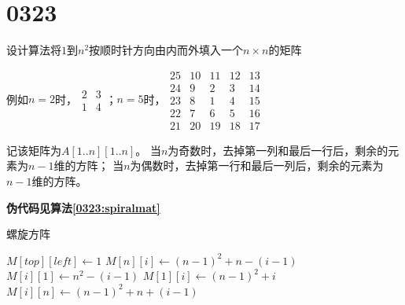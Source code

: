 \section{0323}\label{sec:0323}
\begin{questions}

    \question 设计算法将$1$到$n^2$按顺时针方向由内而外填入一个$n \times n$的矩阵

    例如$n=2$时，$
        \begin{array}{cc}
            2 & 3 \\
            1 & 4
        \end{array}
    $；$n=5$时，$
        \begin{array}{ccccc}
            25 & 10 & 11 & 12 & 13 \\
            24 & 9  & 2  & 3  & 14 \\
            23 & 8  & 1  & 4  & 15 \\
            22 & 7  & 6  & 5  & 16 \\
            21 & 20 & 19 & 18 & 17
        \end{array}
    $

    \begin{solution}
        记该矩阵为$A[1..n][1..n]$。
        当$n$为奇数时，去掉第一列和最后一行后，剩余的元素为$n-1$维的方阵；
        当$n$为偶数时，去掉第一行和最后一列后，剩余的元素为$n-1$维的方阵。

        \textbf{伪代码见算法\ref{0323:spiralmat}}
    \end{solution}

    \begin{algorithm}[!htp]
        \caption{螺旋方阵}\label{0323:spiralmat}
        \begin{algorithmic}[1]
            \State {}
            \Statex
            \Statex
            \State $M[top][left] \gets 1$
             
            \State {} 
            \State $M[n][i] \gets (n-1)^2 + n - (i - 1)$ 
            \State $M[i][1] \gets n^2 - (i - 1)$ 
            \EndFor
            \Else {}
            \State {} 
            \State $M[1][i] \gets (n-1)^2 + i$ 
            \State $M[i][n] \gets (n-1)^2 + n + (i - 1)$ 
            \EndFor
            \EndIf
            \EndProcedure
        \end{algorithmic}
    \end{algorithm}


\end{questions}
